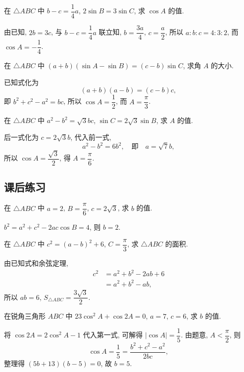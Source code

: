 \begin{exercise}
    在 $\triangle ABC$ 中 $b-c=\dfrac14 a$, $2\sin B=3\sin C$, 求 $\cos A$ 的值.
\end{exercise}
\beginsolution
    由已知, $2b=3c$, 与 $b-c=\dfrac14 a$ 联立知, 
    $b=\dfrac{3a}4$, $c=\dfrac{a}2$, 所以 $a:b:c= 4:3:2$, 而 $\cos A= -\dfrac14$.
\endsolution

\begin{exercise}
    在 $\triangle ABC$ 中 $(a+b)(\sin A-\sin B)=(c-b)\sin C$, 求角 $A$ 的大小.
\end{exercise}
\beginsolution
    已知式化为
    \[(a+b)(a-b)= (c-b)c,\]
    即 $b^2+c^2- a^2= bc$, 所以 $\cos A= \dfrac12$, 而 $A= \dfrac\pi3$.
\endsolution

\begin{exercise}
    在 $\triangle ABC$ 中 $a^2-b^2 = \sqrt3bc$, $\sin C=2\sqrt3\sin B$, 求 $A$ 的值.
\end{exercise}
\beginsolution
    后一式化为 $c= 2\sqrt3b$, 代入前一式,
    \[a^2-b^2= 6b^2,\quad\text{即}\quad a= \sqrt7b,\]
    所以 $\cos A= \dfrac{\sqrt3}2$, 得 $A= \dfrac\pi6$.
\endsolution

\subsection{课后练习}
\begin{exercise}
    在 $\triangle ABC$ 中 $a=2$, $B= \dfrac\pi6$, $c=2\sqrt3$, 求 $b$ 的值.
\end{exercise}
\beginsolution
    $b^2= a^2+c^2- 2ac\cos B= 4$, 则 $b=2$.
\endsolution

\begin{exercise}
    在 $\triangle ABC$ 中 $c^2=(a-b)^2 +6$, $C=\dfrac\pi3$, 求 $\triangle ABC$ 的面积.
\end{exercise}
\beginsolution
    由已知式和余弦定理,
    \[\begin{aligned}
        c^2&= a^2+b^2- 2ab +6\\
        &= a^2+b^2- ab,
    \end{aligned}\]
    所以 $ab=6$, $S_{\triangle ABC}= \dfrac{3\sqrt3}2$.
\endsolution

\begin{exercise}
    在锐角三角形 $ABC$ 中 $23\cos^2 A+\cos2A=0$, $a=7$, $c=6$, 求 $b$ 的值.
\end{exercise}
\beginsolution
    将 $\cos 2A= 2\cos^2 A-1$ 代入第一式, 可解得 $|\cos A|= \dfrac15$. 由题意, $A< \dfrac\pi2$, 则
    \[\cos A= \frac15= \frac{b^2+c^2- a^2}{2bc},\]
    整理得 $(5b+13)(b-5)= 0$, 故 $b= 5$.
\endsolution

